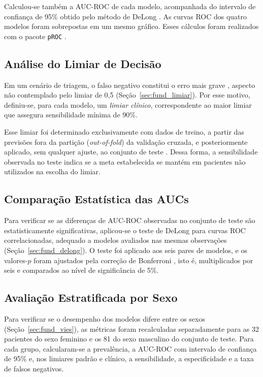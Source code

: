 Calculou-se também a AUC-ROC de cada modelo, acompanhada do intervalo de confiança de 95\% obtido pelo método de DeLong \cite{DeLong1988Comparing}. As curvas ROC dos quatro modelos foram sobrepostas em um mesmo gráfico. Esses cálculos foram realizados com o pacote \texttt{pROC} \cite{Robin2011pROC}.

\subsection{Análise do Limiar de Decisão}
\label{sec:limiar_decisao}

Em um cenário de triagem, o falso negativo constitui o erro mais grave \cite{Habibzadeh2016Determining}, aspecto não contemplado pelo limiar de 0,5 \cite{Elkan2001Foundations} (Seção~\ref{sec:fund_limiar}). Por esse motivo, definiu-se, para cada modelo, um \textit{limiar clínico}, correspondente ao maior limiar que assegura sensibilidade mínima de 90\%.

Esse limiar foi determinado exclusivamente com dados de treino, a partir das previsões fora da partição (\textit{out-of-fold}) da validação cruzada, e posteriormente aplicado, sem qualquer ajuste, ao conjunto de teste \cite{Leeflang2008Bias}. Dessa forma, a sensibilidade observada no teste indica se a meta estabelecida se mantém em pacientes não utilizados na escolha do limiar.

\subsection{Comparação Estatística das AUCs}
\label{sec:comparacao_auc}

Para verificar se as diferenças de AUC-ROC observadas no conjunto de teste são estatisticamente significativas, aplicou-se o teste de DeLong para curvas ROC correlacionadas, adequado a modelos avaliados nas mesmas observações \cite{DeLong1988Comparing} (Seção~\ref{sec:fund_delong}). O teste foi aplicado aos seis pares de modelos, e os valores-$p$ foram ajustados pela correção de Bonferroni \cite{Demsar2006Statistical}, isto é, multiplicados por seis e comparados ao nível de significância de 5\%.

\subsection{Avaliação Estratificada por Sexo}
\label{sec:avaliacao_sexo}

Para verificar se o desempenho dos modelos difere entre os sexos (Seção~\ref{sec:fund_vies}), as métricas foram recalculadas separadamente para as 32 pacientes do sexo feminino e os 81 do sexo masculino do conjunto de teste. Para cada grupo, calcularam-se a prevalência, a AUC-ROC com intervalo de confiança de 95\% e, nos limiares padrão e clínico, a sensibilidade, a especificidade e a taxa de falsos negativos.

